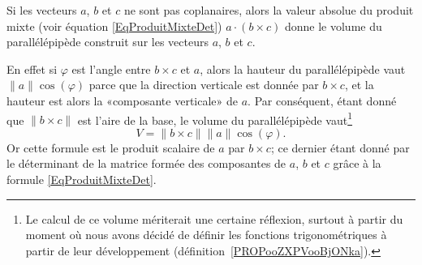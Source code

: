 \begin{normaltext}      \label{NORMooWWOKooWzScnZ}
	Si les vecteurs \( a\), \( b\) et \( c\) ne sont pas coplanaires, alors la valeur absolue du produit mixte (voir équation \eqref{EqProduitMixteDet}) \( a\cdot(b\times c)\) donne le volume du parallélépipède construit sur les vecteurs \( a\), \( b\) et \( c\).

	En effet si \( \varphi\) est l'angle entre \( b\times c\) et \( a\), alors la hauteur du parallélépipède vaut \( \| a \|\cos(\varphi)\) parce que la direction verticale est donnée par \( b\times c\), et la hauteur est alors la «composante verticale» de \( a\). Par conséquent, étant donné que \( \| b\times c \|\) est l'aire de la base, le volume du parallélépipède vaut\footnote{Le calcul de ce volume mériterait une certaine réflexion, surtout à partir du moment où nous avons décidé de définir les fonctions trigonométriques à partir de leur développement (définition~\ref{PROPooZXPVooBjONka}).}
	\begin{equation}
		V=\| b\times c\|  \| a \|\cos(\varphi).
	\end{equation}
	Or cette formule est le produit scalaire de \( a\) par \( b \times c\); ce dernier étant donné par le déterminant de la matrice formée des composantes de \( a\), \( b\) et \( c\) grâce à la formule \eqref{EqProduitMixteDet}.
\end{normaltext}


